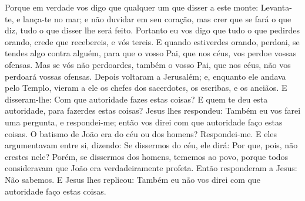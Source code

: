 {  Porque em verdade vos digo que qualquer um que disser a este monte: Levanta-te, e lança-te no mar; e não duvidar em seu coração, mas crer que se fará o que diz, tudo o que disser lhe será feito.
  Portanto eu vos digo que tudo o que pedirdes orando, crede que recebereis, e vós
{} tereis.
  E quando estiverdes orando, perdoai, se tendes algo contra alguém, para que o vosso Pai, que
{} nos céus, vos perdoe vossas ofensas.
  Mas se vós não perdoardes, também o vosso Pai, que
{} nos céus, não vos perdoará vossas ofensas.
  Depois voltaram a Jerusalém; e, enquanto ele andava pelo Templo, vieram a ele os chefes dos sacerdotes, os escribas, e os anciãos.
  E disseram-lhe: Com que autoridade fazes estas coisas? E quem te deu esta autoridade, para fazerdes estas coisas?
  Jesus lhes respondeu: Também eu vos farei uma pergunta, e respondei-me; então vos direi com que autoridade faço estas coisas.
  O batismo de João era do céu ou dos homens? Respondei-me.
  E eles argumentavam entre si, dizendo: Se dissermos do céu, ele dirá: Por que, pois, não crestes nele?
  Porém, se dissermos dos homens, tememos ao povo, porque todos consideravam que João era verdadeiramente profeta.
  Então responderam a Jesus: Não sabemos. E Jesus lhes replicou: Também eu não vos direi com que autoridade faço estas coisas.
\par }

